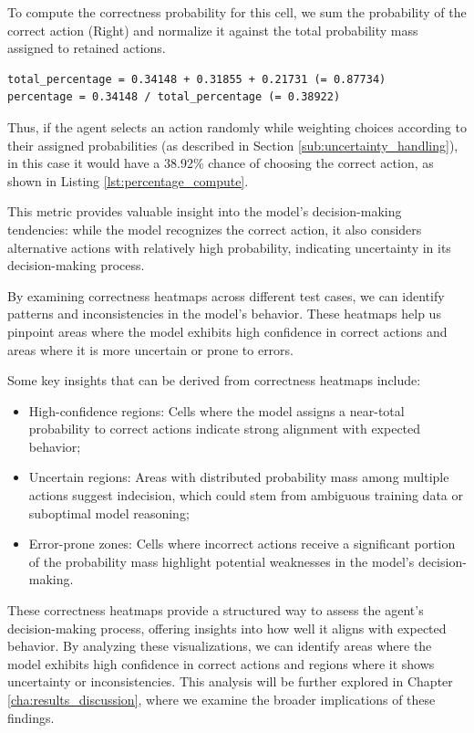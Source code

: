 To compute the correctness probability for this cell, we sum the probability of
the correct action (Right) and normalize it against the total probability mass
assigned to retained actions.

\vspace{5mm}
\begin{codewindow}
  [Text]  \begin{lstlisting}
total_percentage = 0.34148 + 0.31855 + 0.21731 (= 0.87734)
percentage = 0.34148 / total_percentage (= 0.38922)
\end{lstlisting}
\end{codewindow}
\vspace{5mm}

Thus, if the agent selects an action randomly while weighting choices according
to their assigned probabilities (as described in Section \ref{sub:uncertainty_handling}),
in this case it would have a 38.92\% chance of choosing the correct action, as shown
in Listing \ref{lst:percentage_compute}.

This metric provides valuable insight into the model's decision-making tendencies:
while the model recognizes the correct action, it also considers alternative actions
with relatively high probability, indicating uncertainty in its decision-making
process.

By examining correctness heatmaps across different test cases, we can identify patterns
and inconsistencies in the model's behavior. These heatmaps help us pinpoint
areas where the model exhibits high confidence in correct actions and areas
where it is more uncertain or prone to errors.

Some key insights that can be derived from correctness heatmaps include:
\begin{itemize}
  \item High-confidence regions: Cells where the model assigns a near-total
    probability to correct actions indicate strong alignment with expected
    behavior;

  \item Uncertain regions: Areas with distributed probability mass among
    multiple actions suggest indecision, which could stem from ambiguous training
    data or suboptimal model reasoning;

  \item Error-prone zones: Cells where incorrect actions receive a significant
    portion of the probability mass highlight potential weaknesses in the model's
    decision-making.
\end{itemize}
These correctness heatmaps provide a structured way to assess the agent's decision-making
process, offering insights into how well it aligns with expected behavior. By analyzing
these visualizations, we can identify areas where the model exhibits high
confidence in correct actions and regions where it shows uncertainty or
inconsistencies. This analysis will be further explored in Chapter \ref{cha:results_discussion},
where we examine the broader implications of these findings.